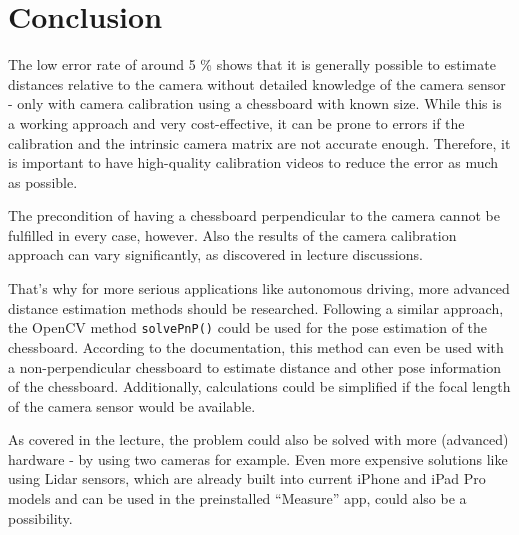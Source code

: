 \chapter{Conclusion}

The low error rate of around 5 \% shows that it is generally possible to estimate distances relative to the camera without detailed knowledge of the camera sensor - only with camera calibration using a chessboard with known size. While this is a working approach and very cost-effective, it can be prone to errors if the calibration and the intrinsic camera matrix are not accurate enough. Therefore, it is important to have high-quality calibration videos to reduce the error as much as possible.

The precondition of having a chessboard perpendicular to the camera cannot be fulfilled in every case, however. Also the results of the camera calibration approach can vary significantly, as discovered in lecture discussions.

That's why for more serious applications like autonomous driving, more advanced distance estimation methods should be researched. Following a similar approach, the OpenCV method \texttt{solvePnP()} could be used for the pose estimation of the chessboard. According to the documentation, this method can even be used with a non-perpendicular chessboard to estimate distance and other pose information of the chessboard. \cite{cv_solvepnp} Additionally, calculations could be simplified if the focal length of the camera sensor would be available.

As covered in the lecture, the problem could also be solved with more (advanced) hardware - by using two cameras for example. Even more expensive solutions like using Lidar sensors, which are already built into current iPhone and iPad Pro models and can be used in the preinstalled \enquote{Measure} app, could also be a possibility. \cite{apple_lidar}